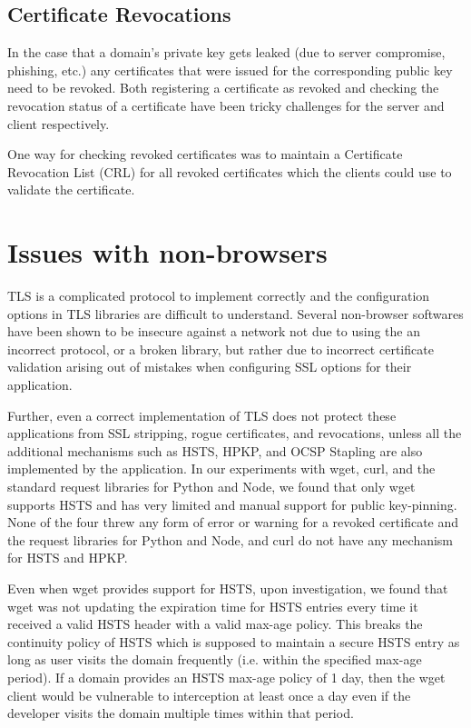 \subsection{Certificate Revocations}
In the case that a domain's private key gets leaked (due to server compromise,
phishing, etc.) any certificates that were issued for the corresponding public
key need to be revoked. Both registering a certificate as revoked and checking the
revocation status of a certificate have been tricky challenges for the server and
client respectively.

One way for checking revoked certificates was to maintain a Certificate Revocation
List (CRL) for all revoked certificates which the clients could use to validate the
certificate.



\section{Issues with non-browsers}
\label{sec:problems-saber}

TLS is a complicated protocol to implement correctly and the configuration
options in TLS libraries are difficult to understand. Several non-browser
softwares have been shown to be insecure against a network not due to using the
an incorrect protocol, or a broken library, but rather due to incorrect
certificate validation arising out of mistakes when configuring SSL options for
their application.

Further, even a correct implementation of TLS does not protect these
applications from SSL stripping, rogue certificates, and revocations, unless
all the additional mechanisms such as HSTS, HPKP, and OCSP Stapling are also
implemented by the application. In our experiments with wget, curl, and the
standard request libraries for Python and Node, we found that only wget
supports HSTS and has very limited and manual support for public key-pinning.
None of the four threw any form of error or warning for a revoked certificate
and the request libraries for Python and Node, and curl do not have any
mechanism for HSTS and HPKP.

Even when wget provides support for HSTS, upon investigation, we found that
wget was not updating the expiration time for HSTS entries every time it
received a valid HSTS header with a valid max-age policy. This breaks the
continuity policy of HSTS which is supposed to maintain a secure HSTS entry as
long as user visits the domain frequently (i.e. within the specified max-age
period). If a domain provides an HSTS max-age policy of 1 day, then the wget
client would be vulnerable to interception at least once a day even if the
developer visits the domain multiple times within that period.

